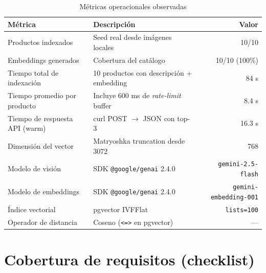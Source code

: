 \documentclass[11pt,letterpaper]{article}
\begin{document}
\begin{table}[H]
\centering
\caption{Métricas operacionales observadas}
\label{tab:opmetrics}
\begin{tabularx}{\linewidth}{l X r}
\toprule
\textbf{Métrica} & \textbf{Descripción} & \textbf{Valor} \\
\midrule
Productos indexados              & Seed real desde imágenes locales                  & 10/10 \\
Embeddings generados             & Cobertura del catálogo                            & 10/10 (100\%) \\
Tiempo total de indexación       & 10 productos con descripción + embedding          & 84 s \\
Tiempo promedio por producto     & Incluye 600 ms de \textit{rate-limit} buffer      & 8.4 s \\
Tiempo de respuesta API (warm)   & curl POST $\rightarrow$ JSON con top-3            & 16.3 s \\
Dimensión del vector             & Matryoshka truncation desde 3072                  & 768 \\
Modelo de visión                 & SDK \texttt{@google/genai} 2.4.0                  & \texttt{gemini-2.5-flash} \\
Modelo de embeddings             & SDK \texttt{@google/genai} 2.4.0                  & \texttt{gemini-embedding-001} \\
Índice vectorial                 & pgvector IVFFlat                                  & \texttt{lists=100} \\
Operador de distancia            & Coseno (\texttt{<=>} en pgvector)                 & --- \\
\bottomrule
\end{tabularx}
\end{table}

\section{Cobertura de requisitos (checklist)}
\end{document}
